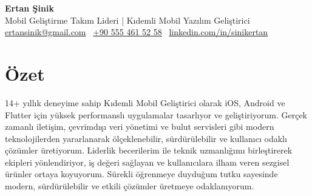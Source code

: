\documentclass[10pt,a4paper]{extarticle}
\begin{document}
\begin{center}
    \begin{minipage}{\textwidth}
        \centering
        {\Huge\textbf{Ertan Şinik}}\\[5pt]
		{\Large Mobil Geliştirme Takım Lideri | Kıdemli Mobil Yazılım Geliştirici}\\[5pt]
        \href{mailto:ertansinik@gmail.com}{ertansinik@gmail.com} \textbullet\
		\href{tel:905554615258}{+90 555 461 52 58} \textbullet\
        \href{https://linkedin.com/in/sinikertan}{linkedin.com/in/sinikertan}
    \end{minipage}
\end{center}
\section{Özet}
14+ yıllık deneyime sahip Kıdemli Mobil Geliştirici olarak iOS, Android ve Flutter için yüksek performanslı uygulamalar tasarlıyor ve geliştiriyorum. Gerçek zamanlı iletişim, çevrimdışı veri yönetimi ve bulut servisleri gibi modern teknolojilerden yararlanarak ölçeklenebilir, sürdürülebilir ve kullanıcı odaklı çözümler üretiyorum. Liderlik becerilerim ile teknik uzmanlığımı birleştirerek ekipleri yönlendiriyor, iş değeri sağlayan ve kullanıcılara ilham veren sezgisel ürünler ortaya koyuyorum. Sürekli öğrenmeye duyduğum tutku sayesinde modern, sürdürülebilir ve etkili çözümler üretmeye odaklanıyorum.
\end{document}
